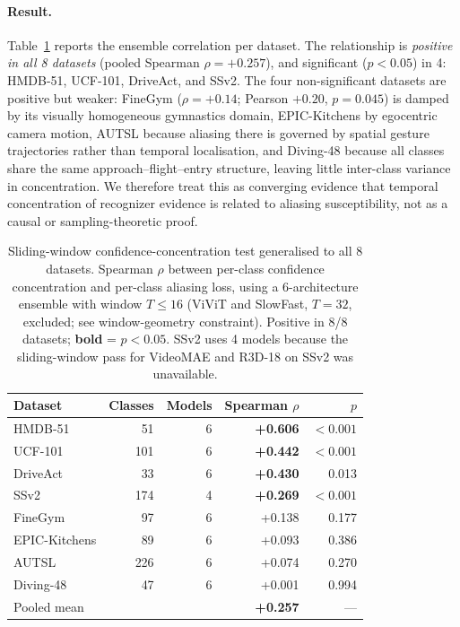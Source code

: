 \documentclass[runningheads]{llncs}
\newcommand{\tabtight}{\setlength{\tabcolsep}{3.5pt}\renewcommand{\arraystretch}{1.12}}
\begin{document}
\paragraph{Result.} Table~\ref{tab:sw_ensemble} reports the ensemble correlation per dataset. The relationship is \emph{positive in all 8 datasets} (pooled Spearman $\rho=+0.257$), and significant ($p<0.05$) in 4: HMDB-51, UCF-101, DriveAct, and SSv2. The four non-significant datasets are positive but weaker: FineGym ($\rho=+0.14$; Pearson $+0.20$, $p=0.045$) is damped by its visually homogeneous gymnastics domain, EPIC-Kitchens by egocentric camera motion, AUTSL because aliasing there is governed by spatial gesture trajectories rather than temporal localisation, and Diving-48 because all classes share the same approach--flight--entry structure, leaving little inter-class variance in concentration. We therefore treat this as converging evidence that temporal concentration of recognizer evidence is related to aliasing susceptibility, not as a causal or sampling-theoretic proof.

\begin{table}[!htbp]
\centering
\caption{Sliding-window confidence-concentration test generalised to all 8 datasets. Spearman $\rho$ between per-class confidence concentration and per-class aliasing loss, using a 6-architecture ensemble with window $T\le16$ (ViViT and SlowFast, $T=32$, excluded; see window-geometry constraint). Positive in 8/8 datasets; \textbf{bold} = $p<0.05$. SSv2 uses 4 models because the sliding-window pass for VideoMAE and R3D-18 on SSv2 was unavailable.}
\label{tab:sw_ensemble}
\scriptsize\tabtight
\begin{tabular}{l r r r r}
\toprule
Dataset & Classes & Models & Spearman $\rho$ & $p$ \\
\midrule
HMDB-51       &  51 & 6 & \textbf{+0.606} & ${<}0.001$ \\
UCF-101       & 101 & 6 & \textbf{+0.442} & ${<}0.001$ \\
DriveAct      &  33 & 6 & \textbf{+0.430} & 0.013 \\
SSv2          & 174 & 4 & \textbf{+0.269} & ${<}0.001$ \\
FineGym       &  97 & 6 & +0.138 & 0.177 \\
EPIC-Kitchens &  89 & 6 & +0.093 & 0.386 \\
AUTSL         & 226 & 6 & +0.074 & 0.270 \\
Diving-48     &  47 & 6 & +0.001 & 0.994 \\
\midrule
Pooled mean   &     &   & \textbf{+0.257} & --- \\
\bottomrule
\end{tabular}
\end{table}
\end{document}
